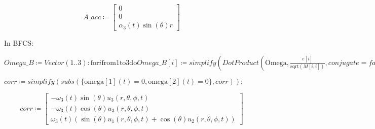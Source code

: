 \documentclass{article}
\begin{document}
\begin{dmath}\label{(11)}
\textit{A\_acc} \coloneqq \left[\begin{array}{c}
0 
\\
 0 
\\
 \alpha_{3}\! \left(t \right) \sin \! \left(\theta \right) r  
\end{array}\right]
\end{dmath}
\begin{Maple Normal}
In BFCS:
\end{Maple Normal}
\begin{Maple Normal}

\end{Maple Normal}
\begin{Maple Normal}
{$ \displaystyle \textit{Omega\_B} \coloneqq \mathit{Vector} (1..3)\colon \boldsymbol{\mathrm{for}}i \boldsymbol{\mathrm{from}}1\boldsymbol{\mathrm{to}}3\boldsymbol{\mathrm{do}}\textit{Omega\_B} [i]\coloneqq \mathit{simplify} (\mathit{DotProduct} (\mathrm{Omega},\frac{e [i]}{\mathrm{sqrt}(M [i ,i])},\mathit{conjugate} =\mathit{false}),\mathit{assume} =[0<x [1],\sin (x [2])>0])\boldsymbol{\mathrm{end}}\boldsymbol{\mathrm{do}}\colon \mathit{corr} \coloneqq \mathit{simplify} (\mathit{CrossProduct} (\textit{Omega\_B} ,U),\mathit{assume} =[0<x [1],\sin (x [2])>0])\colon  $}
\end{Maple Normal}
\begin{Maple Normal}

\end{Maple Normal}
\begin{Maple Normal}
{$ \displaystyle \mathit{corr} \coloneqq \mathit{simplify} (\mathit{subs} ({\{\mathrm{omega}[1](t)=0,\mathrm{omega}[2](t)=0\}},\mathit{corr})); $}
\end{Maple Normal}
\begin{dmath}\label{(12)}
\mathit{corr} \coloneqq \left[\begin{array}{c}
-\omega_{3}\! \left(t \right) \sin \! \left(\theta \right) u_{3}\! \left(r ,\theta ,\phi ,t \right) 
\\
 -\omega_{3}\! \left(t \right) \cos \! \left(\theta \right) u_{3}\! \left(r ,\theta ,\phi ,t \right) 
\\
 \omega_{3}\! \left(t \right) \left(\sin \! \left(\theta \right) u_{1}\! \left(r ,\theta ,\phi ,t \right)+\cos \! \left(\theta \right) u_{2}\! \left(r ,\theta ,\phi ,t \right)\right) 
\end{array}\right]
\end{dmath}
\end{document}
